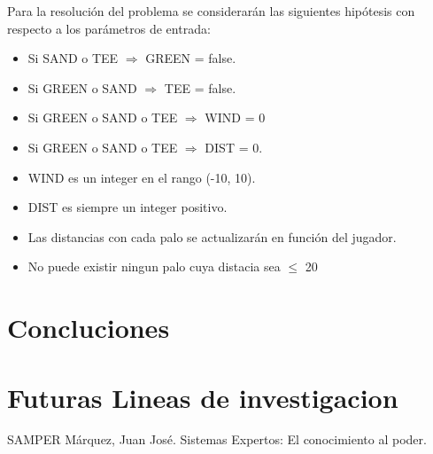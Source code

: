 \documentclass[runningheads,a4paper]{llncs}
\begin{document}
Para la resolución del problema se considerarán las siguientes hipótesis con respecto a los parámetros de entrada:\\
\begin{itemize}
	\item Si SAND o TEE $\Rightarrow$ GREEN = false.
	\item Si GREEN o SAND $\Rightarrow$ TEE = false.
	\item Si GREEN o SAND o TEE $\Rightarrow$ WIND = 0 
	\item Si GREEN o SAND o TEE $\Rightarrow$ DIST = 0.
	\item WIND es un integer en el rango (-10, 10).
	\item DIST es siempre un integer positivo.
	\item Las distancias con cada palo se actualizarán en función del jugador.
	\item No puede existir ningun palo cuya distacia sea $\leq$ 20
\end{itemize}


\section{Concluciones}

\section{Futuras Lineas de investigacion}



\begin{thebibliography}{7}

 SAMPER Márquez, Juan José. Sistemas Expertos: El conocimiento al poder.

\end{thebibliography}
\end{document}
